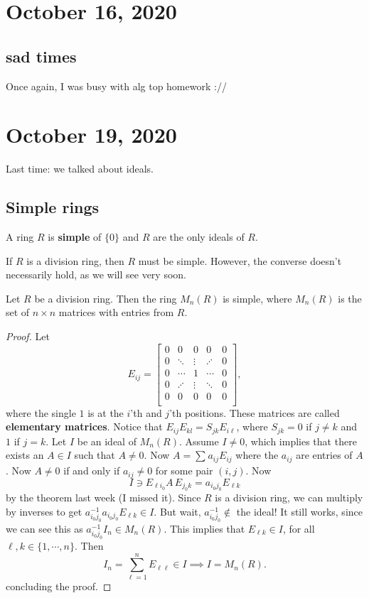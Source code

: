 \section{October 16, 2020}
\subsection{sad times}
Once again, I was busy with alg top homework ://
\section{October 19, 2020}
Last time: we talked about ideals.
\subsection{Simple rings}
\begin{definition}
    A ring $R$ is \textbf{simple} of $\{0\} $ and $R$ are the only ideals of $R$.
\end{definition}
\begin{remark}
    If $R$ is a division ring, then $R$ must be simple. However, the converse doesn't necessarily hold, as we will see very soon.
\end{remark}
\begin{theorem}
    Let $R$ be a division ring. Then the ring $M_n (R)$ is simple, where $M_n (R)$ is the set of $n\times n$ matrices with entries from $R$.
\end{theorem}
\begin{proof}
    Let \[
    E_{ij}=
    \begin{bmatrix}
        0 & 0 & 0& 0& 0\\
        0 & \ddots & \vdots & \iddots & 0\\
        0 & \cdots & 1 & \cdots & 0 \\
        0 & \iddots & \vdots & \ddots & 0\\
        0 & 0 & 0& 0& 0\\
    \end{bmatrix},
\] where the single $1$ is at the $i$'th and $j$'th positions. These matrices are called \textbf{elementary matrices}. Notice that $E_{ij}E_{kl}=S_{jk}E_{i\ell}$, where $S_{jk}=0$ if $j\neq k$ and $1$ if $j=k$. Let $I$ be an ideal of $M_n (R)$. Assume $I\neq 0$, which implies that there exists an $A\in I$ such that $A\neq 0$. Now $A=\sum_{}^{} a_{ij}E_{ij}$ where the $a_{ij}$ are entries of $A$. Now $A\neq 0$ if and only if $a_{ij}\neq 0$ for some pair $(i,j)$. Now \[
I\ni E_{\ell i_0}A\,E_{j_0 k}=a_{i_0 j_0}E_{\ell k}
\] by the theorem last week (I missed it). Since $R$ is a division ring, we can multiply by inverses to get $a^{-1}_{i_0j_0}a_{i_0j_0}E_{\ell k}\in I$. But wait, $a_{i_0j_0}^{-1}\notin$ the ideal! It still works, since we can see this as $a_{i_0j_0}^{-1}I_n \in M_n (R)$. This implies that $E_{\ell k}\in I$, for all $\ell,k\in \{1,\cdots ,n\} $. Then \[
I_n =\sum_{\ell =1}^{n} E_{\ell \ell}\in I\implies I=M_n (R).
\] concluding the proof.
\end{proof}
